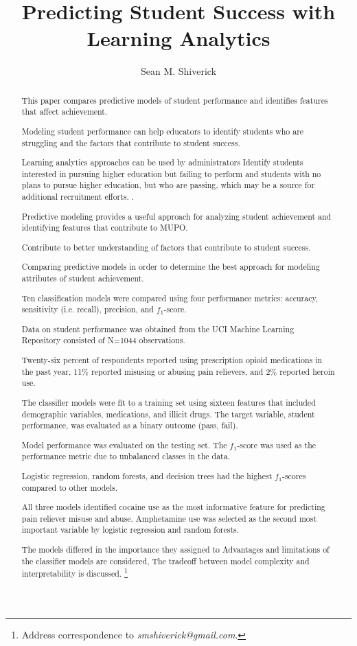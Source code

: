 \documentclass[sigconf]{acmart}
\begin{document}
  \title{Predicting Student Success with Learning Analytics}
  \author{Sean M. Shiverick}
\renewcommand{\shortauthors}{S.M. Shiverick}


\begin{abstract}

This paper compares predictive models of student performance and identifies 
features that affect achievement. 


Modeling student performance can help educators to identify students who are 
struggling and the factors that contribute to student success. 

Learning analytics approaches can be used by administrators Identify students interested in pursuing higher education but failing to perform and students 
with no plans to pursue higher education, but who are passing, which may be a 
source for additional recruitment efforts. . 

Predictive modeling provides a useful approach for analyzing student achievement 
and identifying features that contribute to MUPO. 

Contribute to better understanding of factors that contribute to student success. 

Comparing predictive models in order to determine the best approach for 
modeling attributes of student achievement. 

Ten classification models were compared using four performance metrics: accuracy, sensitivity (i.e. recall), 
precision, and $f_1$-score. 

Data on student performance was obtained from the UCI Machine Learning Repository consisted of N=1044 observations. 

Twenty-six percent of respondents reported using prescription 
opioid medications in the past year, 11\% reported misusing or abusing pain 
relievers, and 2\% reported heroin use. 

The classifier models were fit to 
a training set using sixteen features that included demographic variables, 
medications, and illicit drugs. The target variable, student performance, was 
evaluated as a binary outcome (pass, fail). 

Model performance was evaluated on the testing set. The
$f_1$-score was used as the performance metric due to unbalanced classes in
the data. 

Logistic regression, random forests, and decision trees had the 
highest $f_1$-scores compared to other models. 

All three models identified cocaine use as the most informative feature for predicting pain reliever 
misuse and abuse. Amphetamine use was selected as the second most important 
variable by logistic regression and random forests.

The models differed in 
the importance they assigned to
Advantages and limitations of the classifier models are considered, The 
tradeoff between model complexity and interpretability is discussed. 
\footnote{Address correspondence to \textit{smshiverick@gmail.com}.}

\end{abstract}
\end{document}
